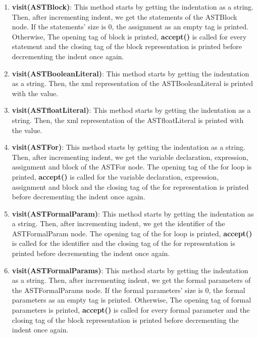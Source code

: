 \documentclass{article}
\begin{document}
\begin{enumerate}
					\item \textbf{visit(ASTBlock)}: This method starts by getting the indentation as a string. Then, after incrementing indent, we get the statements of the ASTBlock node.  If the statements' size is 0, the assignment as an empty tag is printed. Otherwise,  The opening tag of block is printed, \textbf{accept()} is called for every statement and the closing tag of the block representation is printed before decrementing the indent once again.	
			
					\item \textbf{visit(ASTBooleanLiteral)}: This method starts by getting the indentation as a string. Then, the xml representation of the ASTBooleanLiteral is printed with the value.
			
					\item \textbf{visit(ASTfloatLiteral)}: This method starts by getting the indentation as a string. Then, the xml representation of the ASTfloatLiteral is printed with the value.
					
					\item \textbf{visit(ASTFor)}: This method starts by getting the indentation as a string. Then, after incrementing indent, we get the variable declaration, expression, assignment and block of the ASTFor node.  The opening tag of the for loop is printed, \textbf{accept()} is called for the variable declaration, expression, assignment and block and the closing tag of the for  representation is printed before decrementing the indent once again.		
			
					\item \textbf{visit(ASTFormalParam)}: This method starts by getting the indentation as a string. Then, after incrementing indent, we get the identifier of the ASTFormalParam node.  The opening tag of the for loop is printed, \textbf{accept()} is called for the identifier and the closing tag of the for  representation is printed before decrementing the indent once again.		
					
					\item \textbf{visit(ASTFormalParams)}: This method starts by getting the indentation as a string. Then, after incrementing indent, we get the formal parameters of the ASTFormalParams node.  If the formal parameters' size is 0, the formal parameters as an empty tag is printed. Otherwise,  The opening tag of formal parameters is printed, \textbf{accept()} is called for every formal parameter and the closing tag of the block representation is printed before decrementing the indent once again.	
			

\end{enumerate}
\end{document}
